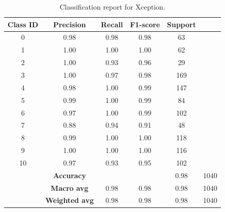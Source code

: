 \begin{table}[h]
    \centering
    \begin{tabular}{cccccc}
        \toprule
        \textbf{Class ID} & \textbf{Precision} & \textbf{Recall} & \textbf{F1-score} & \textbf{Support} \\
        \midrule
        0 & 0.98 & 0.98 & 0.98 & 63 \\
        1 & 1.00 & 1.00 & 1.00 & 62 \\
        2 & 1.00 & 0.93 & 0.96 & 29 \\
        3 & 1.00 & 0.97 & 0.98 & 169 \\
        4 & 0.98 & 1.00 & 0.99 & 147 \\
        5 & 0.99 & 1.00 & 0.99 & 84 \\
        6 & 0.97 & 1.00 & 0.99 & 102 \\
        7 & 0.88 & 0.94 & 0.91 & 48 \\
        8 & 0.99 & 1.00 & 1.00 & 118 \\
        9 & 1.00 & 1.00 & 1.00 & 116 \\
        10 & 0.97 & 0.93 & 0.95 & 102 \\
        \midrule
        \textbf{} & \textbf{Accuracy} & & & 0.98 & 1040 \\
        \textbf{} & \textbf{Macro avg} & 0.98 & 0.98 & 0.98 & 1040 \\
        \textbf{} & \textbf{Weighted avg} & 0.98 & 0.98 & 0.98 & 1040 \\
        \bottomrule
    \end{tabular}
    \caption{Classification report for Xception.}
    \label{tab:classification_report_xception}
\end{table}


